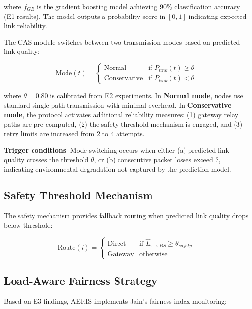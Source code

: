 \documentclass[sensors,article,submit,moreauthors,pdftex]{Definitions/mdpi}
\begin{document}
where $f_{GB}$ is the gradient boosting model achieving 90\% classification accuracy (E1 results). The model outputs a probability score in $[0, 1]$ indicating expected link reliability.

The CAS module switches between two transmission modes based on predicted link quality:

\begin{equation}
\text{Mode}(t) = \begin{cases}
\text{Normal} & \text{if } P_{link}(t) \geq \theta \\
\text{Conservative} & \text{if } P_{link}(t) < \theta
\end{cases}
\end{equation}

where $\theta = 0.80$ is calibrated from E2 experiments. In \textbf{Normal mode}, nodes use standard single-path transmission with minimal overhead. In \textbf{Conservative mode}, the protocol activates additional reliability measures: (1) gateway relay paths are pre-computed, (2) the safety threshold mechanism is engaged, and (3) retry limits are increased from 2 to 4 attempts.

\textbf{Trigger conditions}: Mode switching occurs when either (a) predicted link quality crosses the threshold $\theta$, or (b) consecutive packet losses exceed 3, indicating environmental degradation not captured by the prediction model.

\subsection{Safety Threshold Mechanism}

The safety mechanism provides fallback routing when predicted link quality drops below threshold:

\begin{equation}
\text{Route}(i) = \begin{cases}
\text{Direct} & \text{if } \hat{L}_{i \to BS} \geq \theta_{safety} \\
\text{Gateway} & \text{otherwise}
\end{cases}
\end{equation}

\subsection{Load-Aware Fairness Strategy}

Based on E3 findings, AERIS implements Jain's fairness index monitoring:
\end{document}
